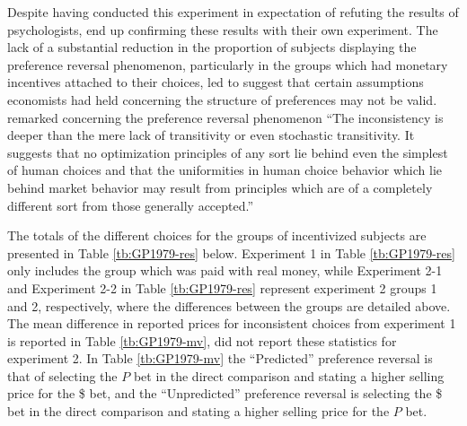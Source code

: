 \documentclass[../main.tex]{subfiles}
\begin{document}
Despite having conducted this experiment in expectation of refuting the results of psychologists, \textcite{Grether1979} end up confirming these results with their own experiment.
The lack of a substantial reduction in the proportion of subjects displaying the preference reversal phenomenon, particularly in the groups which had monetary incentives attached to their choices, led \textcite{Grether1979} to suggest that certain assumptions economists had held concerning the structure of preferences may not be valid.
\textcite[623]{Grether1979} remarked concerning the preference reversal phenomenon \enquote{The inconsistency is deeper than the mere lack of transitivity or even stochastic transitivity.
It suggests that no optimization principles of any sort lie behind even the simplest of human choices and that the uniformities in human choice behavior which lie behind market behavior may result from principles which are of a completely different sort from those generally accepted.}

The totals of the different choices for the groups of incentivized subjects are presented in Table \ref{tb:GP1979-res} below.
Experiment 1 in Table \ref{tb:GP1979-res} only includes the group which was paid with real money, while Experiment 2-1 and Experiment 2-2 in Table \ref{tb:GP1979-res} represent experiment 2 groups 1 and 2, respectively,  where the differences between the groups are detailed above.
The mean difference in reported prices for inconsistent choices from experiment 1 is reported in Table \ref{tb:GP1979-mv}, \textcite{Grether1979} did not report these statistics for experiment 2.
In Table \ref{tb:GP1979-mv} the \enquote{Predicted} preference reversal is that of selecting the $P$ bet in the direct comparison and stating a higher selling price for the {\$} bet, and the \enquote{Unpredicted} preference reversal is selecting the {\$} bet in the direct comparison and stating a higher selling price for the $P$ bet.
\end{document}
